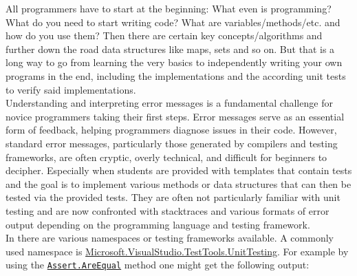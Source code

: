 All programmers have to start at the beginning: What even is programming? What do you need to start writing code? What are variables/methods/etc. and how do you use them?
Then there are certain key concepts/algorithms and further down the road data structures like maps, sets and so on.
But that is a long way to go from learning the very basics to independently writing your own programs in the end, including the implementations and the according unit tests to verify said implementations.\\[5pt]
Understanding and interpreting error messages is a fundamental challenge for novice programmers taking their first steps.
Error messages serve as an essential form of feedback, helping programmers diagnose issues in their code.
However, standard error messages, particularly those generated by compilers and testing frameworks,
are often cryptic, overly technical, and difficult for beginners to decipher.
Especially when students are provided with templates that contain tests and the goal is to implement various methods or data structures that can then be tested via the provided tests.
They are often not particularly familiar with unit testing and are now confronted with stacktraces and various formats of error output depending on the programming language and testing framework.\\[5pt]
In \fs{} there are various namespaces or testing frameworks available.
A commonly used namespace is \href{https://learn.microsoft.com/en-us/dotnet/api/microsoft.visualstudio.testtools.unittesting}{Microsoft.VisualStudio.TestTools.UnitTesting}.
For example by using the \href{https://learn.microsoft.com/en-us/dotnet/api/microsoft.visualstudio.testtools.unittesting.assert.areequal?view=mstest-net-3.8}{\texttt{Assert.AreEqual}} method one might get the following output:

